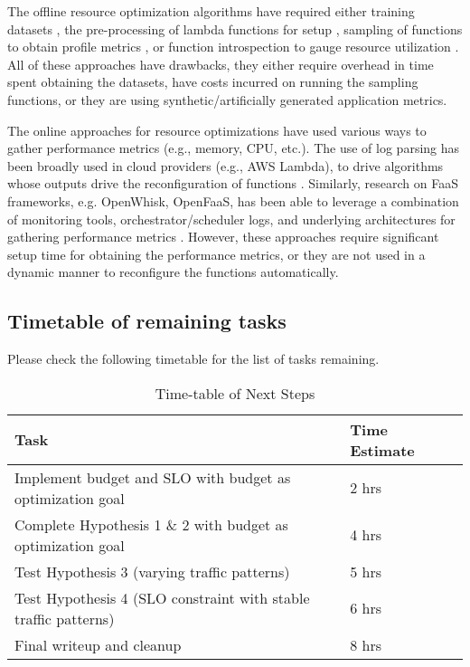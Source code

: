 \documentclass[conference]{IEEEtran}
\begin{document}
The offline resource optimization algorithms have required either training datasets \cite{10.1145/3464298.3493398, 10.1145/3542929.3563468}, the pre-processing of lambda functions for setup \cite{10.1109/INFOCOM48880.2022.9796962, 8567674}, sampling of functions to obtain profile metrics \cite{10.1145/3542929.3563464}, or function introspection to gauge resource utilization \cite{s23187829, 9336272}. All of these approaches have drawbacks, they either require overhead in time spent obtaining the datasets, have costs incurred on running the sampling functions, or they are using synthetic/artificially generated application metrics.

The online approaches for resource optimizations have used various ways to gather performance metrics (e.g., memory, CPU, etc.). The use of log parsing has been broadly used in cloud providers (e.g., AWS Lambda), to drive algorithms whose outputs drive the reconfiguration of functions \cite{10063937, 9860980}. Similarly, research on FaaS frameworks, e.g. OpenWhisk, OpenFaaS, has been able to leverage a combination of monitoring tools, orchestrator/scheduler logs, and underlying architectures for gathering performance metrics \cite{9582234, 10.1145/3472883.3486992, 9946331}. However, these approaches require significant setup time for obtaining the performance metrics, or they are not used in a dynamic manner to reconfigure the functions automatically.

\subsection{Timetable of remaining tasks}

Please check the following timetable for the list of tasks remaining.

\begin{table}[h]
    \centering
    \begin{tabular}{| p{2in} | p{0.75in} |}
        \hline Task & Time Estimate\ \\
        \hline Implement budget and SLO with budget as optimization goal & 2 hrs\\
        \hline Complete Hypothesis 1 \& 2 with budget as optimization goal & 4 hrs \\
        \hline Test Hypothesis 3 (varying traffic patterns) & 5 hrs \\
        \hline Test Hypothesis 4 (SLO constraint with stable traffic patterns) & 6 hrs \\
        \hline Final writeup and cleanup & 8 hrs \\
        \hline 
    \end{tabular}
    \caption{Time-table of Next Steps}
    \label{table: t3}
\end{table}



\end{document}
